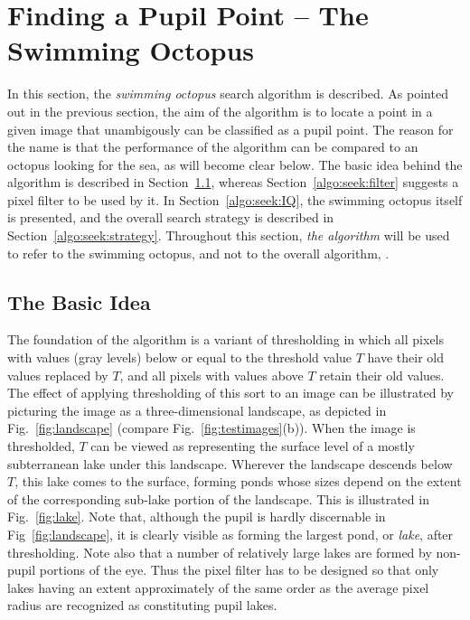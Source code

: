 
\section{Finding a Pupil Point -- The Swimming Octopus}
\label{algo:seek}

In this section, the {\em swimming octopus\/} search algorithm is
described.  As pointed out in the previous section, the aim of the
algorithm is to locate a point in a given image that unambigously can
be classified as a pupil point.  The reason for the name is that the
performance of the algorithm can be compared to an octopus looking for
the sea, as will become clear below.  The basic idea behind the
algorithm is described in Section~\ref{algo:seek:idea}, whereas
Section~\ref{algo:seek:filter} suggests a pixel filter to be used by
it.  In Section~\ref{algo:seek:IQ}, the swimming octopus itself is
presented, and the overall search strategy is described in
Section~\ref{algo:seek:strategy}.  Throughout this section, {\em the
  algorithm\/} will be used to refer to the swimming octopus, and not
to the overall algorithm, {\octopus}.

\subsection{The Basic Idea}
\label{algo:seek:idea}


The foundation of the algorithm is a variant of thresholding in which
all pixels with values (gray levels) below or equal to the threshold
value $T$ have their old values replaced by $T$, and all pixels with
values above $T$ retain their old values.  The effect of applying
thresholding of this sort to an image can be illustrated by picturing
the image as a three-dimensional landscape, as depicted in
Fig.~\ref{fig:landscape} (compare Fig.~\ref{fig:testimages}(b)).  When
the image is thresholded, $T$ can be viewed as representing the
surface level of a mostly subterranean lake under this landscape.
Wherever the landscape descends below $T$, this lake comes to the
surface, forming ponds whose sizes depend on the extent of the
corresponding sub-lake portion of the landscape.  This is illustrated
in Fig.~\ref{fig:lake}.  Note that, although the pupil is hardly
discernable in Fig~\ref{fig:landscape}, it is clearly visible as
forming the largest pond, or {\em lake\/}, after thresholding.  Note
also that a number of relatively large lakes are formed by non-pupil
portions of the eye.  Thus the pixel filter has to be designed so that
only lakes having an extent approximately of the same order as the
average pixel radius are recognized as constituting pupil lakes.

